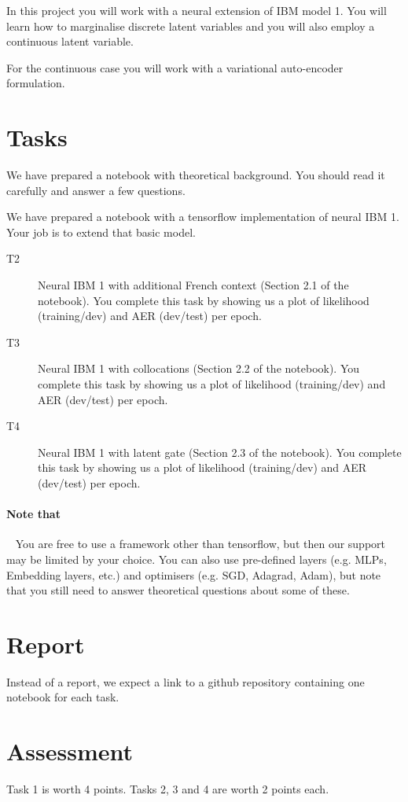 In this project you will work with a neural extension of IBM model 1. 
You will learn how to marginalise discrete latent variables and you will also employ a continuous latent variable.

For the continuous case you will work with a variational auto-encoder formulation.


\section{Tasks}

\begin{description}
	\item[T1] We have prepared a notebook with theoretical background. You should read it carefully and answer a few questions.
	\item We have prepared a notebook with a tensorflow implementation of neural IBM 1. Your job is to extend that basic model. 
	\begin{description}
		\item[T2] Neural IBM 1 with additional French context (Section 2.1 of the notebook). You complete this task by showing us a plot of likelihood (training/dev) and AER (dev/test) per epoch.
		\item[T3] Neural IBM 1 with collocations (Section 2.2 of the notebook). You complete this task by showing us a plot of likelihood (training/dev) and AER (dev/test) per epoch.
		\item[T4] Neural IBM 1 with latent gate (Section 2.3 of the notebook). You complete this task by showing us a plot of likelihood (training/dev) and AER (dev/test) per epoch.
	\end{description}
\end{description}

\paragraph{Note that} ~ You are free to use a framework other than tensorflow, but then our support may be limited by your choice. You can also use pre-defined layers (e.g. MLPs, Embedding layers, etc.) and optimisers (e.g. SGD, Adagrad, Adam), but note that you still need to answer theoretical questions about some of these.
 

\section{Report}

Instead of a report, we expect a link to a github repository containing one notebook for each task. 

\section{Assessment}

Task 1 is worth 4 points. Tasks 2, 3 and 4 are worth 2 points each. 
